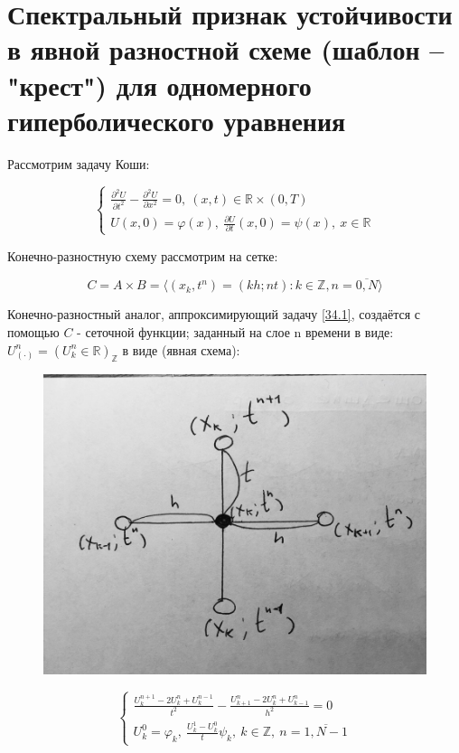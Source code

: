 \documentclass[__main__.tex]{subfiles}
\begin{document}
\section{Спектральный признак устойчивости в явной разностной схеме (шаблон -- "крест") для одномерного гиперболического уравнения}

Рассмотрим задачу Коши:

\begin{equation} \label{34.1}
\begin{cases}
\frac{\partial^2 U}{\partial t^2} - \frac{\partial^2 U}{\partial x^2} = 0, \ \left(x,t\right) \in \mathbb{R} \times \left(0,T\right) \\
U \left(x,0\right) = \varphi \left(x\right), \ \frac{\partial U}{\partial t} \left(x,0\right) = \psi \left(x\right), \ x\in \mathbb{R}
\end{cases}
\end{equation}

Конечно-разностную схему рассмотрим на сетке:

$$
C = A \times B = \langle \left(x_k, t^n\right) = \left(k h; n t\right): k \in \mathbb{Z}, n = \overline{0,N} \rangle
$$

Конечно-разностный аналог, аппроксимирующий задачу \ref{34.1}, создаётся с помощью $C$ - сеточной функции; заданный на слое n времени в виде: $U^n_{\left(\cdot\right)} = \left(U^n_k \in\mathbb{R}\right)_{\mathbb{Z}}$ в виде (явная схема):

\begin{figure}[ht]
	\centering
	\includegraphics[width=0.4\linewidth]{img/img_34-1}
	\caption{}
	\label{img_34.1}
\end{figure}

\begin{equation}\label{34.2}
\begin{cases}
\frac{U^{n+1}_k - 2U^n_k+U^{n-1}_k}{t^2} - \frac{U^n_{k+1} -2U^n_k+U^n_{k-1}}{h^2} = 0 \\
U^0_k = \varphi_k, \ \frac{U^1_k - U^0_k}{t} \psi_k, \ k\in\mathbb{Z}, \ n = \overline{1,N-1}
\end{cases}
\end{equation}
\end{document}
